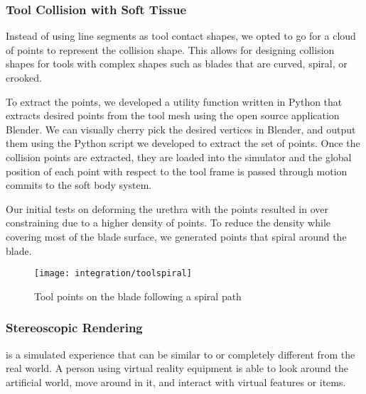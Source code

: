 \subsubsection{Tool Collision with Soft Tissue}
Instead of using line segments as tool contact shapes, we opted to go for a cloud of points to represent the collision shape. This allows for designing collision shapes for tools with complex shapes such as blades that are curved, spiral, or crooked.

To extract the points, we developed a utility function written in Python that extracts desired points from the tool mesh using the open source application Blender. We can visually cherry pick the desired vertices in Blender, and output them using the Python script we developed to extract the set of points. Once the collision points are extracted, they are loaded into the simulator and the global position of each point with respect to the tool frame is passed through motion commits to the soft body system.

Our initial tests on deforming the urethra with the points resulted in over constraining due to a higher density of points. To reduce the density while covering most of the blade surface, we generated points that spiral around the blade.

\begin{figure}
  \centering
  \texttt{[image: integration/toolspiral]}
  \caption{Tool points on the blade following a spiral path}
  \label{fig:spiral_tool}
\end{figure}

\label{sec:haptic}

\subsubsection{Stereoscopic Rendering}
\label{sec:stereo}
 is a simulated experience that can be similar to or completely different from the real world. A person using virtual reality equipment is able to look around the artificial world, move around in it, and interact with virtual features or items.

